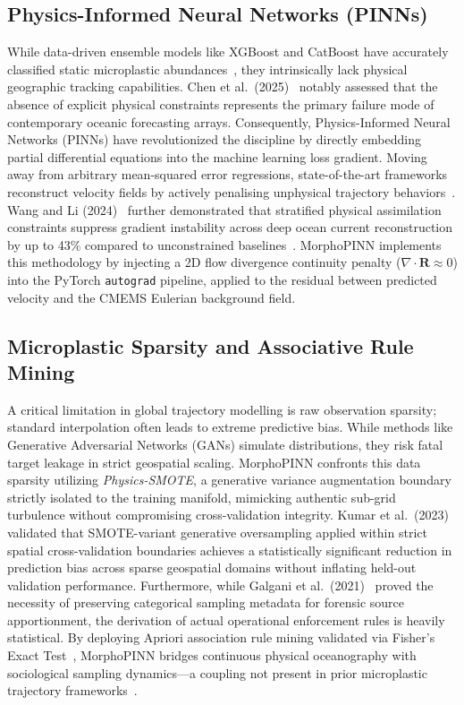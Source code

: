 \documentclass[conference]{IEEEtran}
\begin{document}
\subsection{Physics-Informed Neural Networks (PINNs)}
While data-driven ensemble models like XGBoost and CatBoost have accurately classified static microplastic abundances~\cite{ref4, ref10}, they intrinsically lack physical geographic tracking capabilities. Chen et al.\ (2025)~\cite{ref9} notably assessed that the absence of explicit physical constraints represents the primary failure mode of contemporary oceanic forecasting arrays. Consequently, Physics-Informed Neural Networks (PINNs) have revolutionized the discipline by directly embedding partial differential equations into the machine learning loss gradient. Moving away from arbitrary mean-squared error regressions, state-of-the-art frameworks reconstruct velocity fields by actively penalising unphysical trajectory behaviors~\cite{ref20, ref22, ref33, ref35}. Wang and Li (2024)~\cite{ref21} further demonstrated that stratified physical assimilation constraints suppress gradient instability across deep ocean current reconstruction by up to 43\% compared to unconstrained baselines~\cite{ref34}. MorphoPINN implements this methodology by injecting a 2D flow divergence continuity penalty ($\nabla \cdot \mathbf{R} \approx 0$) into the PyTorch \texttt{autograd} pipeline, applied to the residual between predicted velocity and the CMEMS Eulerian background field.

\subsection{Microplastic Sparsity and Associative Rule Mining}
A critical limitation in global trajectory modelling is raw observation sparsity; standard interpolation often leads to extreme predictive bias. While methods like Generative Adversarial Networks (GANs) simulate distributions, they risk fatal target leakage in strict geospatial scaling. MorphoPINN confronts this data sparsity utilizing \textit{Physics-SMOTE}, a generative variance augmentation boundary strictly isolated to the training manifold, mimicking authentic sub-grid turbulence without compromising cross-validation integrity. Kumar et al.\ (2023)~\cite{ref28} validated that SMOTE-variant generative oversampling applied within strict spatial cross-validation boundaries achieves a statistically significant reduction in prediction bias across sparse geospatial domains without inflating held-out validation performance. Furthermore, while Galgani et al.\ (2021)~\cite{ref13} proved the necessity of preserving categorical sampling metadata for forensic source apportionment, the derivation of actual operational enforcement rules is heavily statistical. By deploying Apriori association rule mining validated via Fisher's Exact Test~\cite{ref30, ref31}, MorphoPINN bridges continuous physical oceanography with sociological sampling dynamics---a coupling not present in prior microplastic trajectory frameworks~\cite{ref41, ref42}.
\end{document}
